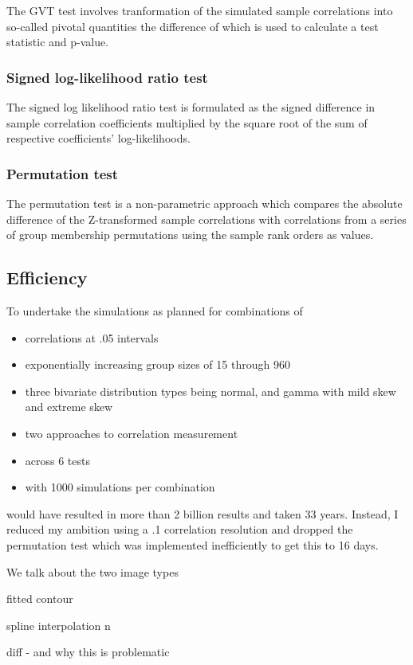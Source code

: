 The GVT test involves tranformation of the simulated sample correlations into so-called pivotal quantities the difference of which is used to calculate a test statistic and p-value.


\subsubsection{Signed log-likelihood ratio test}
The signed log likelihood ratio test is formulated as the signed difference in sample correlation coefficients multiplied by the square root of the sum of respective coefficients' log-likelihoods.


\subsubsection{Permutation test}
The permutation test is a non-parametric approach which compares the absolute difference of the Z-transformed sample correlations with correlations from a series of group membership permutations using the sample rank orders as values.

\subsection{Efficiency}
To undertake the simulations as planned for combinations of 
\begin{itemize}
  \item correlations at .05 intervals 
  \item exponentially increasing group sizes of 15 through 960
  \item three bivariate distribution types being normal, and gamma with mild skew and extreme skew
  \item two approaches to correlation measurement 
  \item across 6 tests
  \item with 1000 simulations per combination 
\end{itemize}
would have resulted in more than 2 billion results and taken 33 years.  Instead, I reduced my ambition using a .1 correlation resolution and dropped the permutation test which was implemented inefficiently to get this to 16 days.
  

  
  We talk about the two image types
  
  fitted contour
  
  spline interpolation
  n
  
  diff - and why this is problematic

